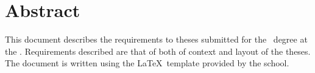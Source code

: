 \chapter*{Abstract}\label{abstract}
This document describes the requirements to theses submitted for the
\ThesisDegreeName\ degree at the \ThesisSchoolName.  Requirements
described are that of both of context and layout of the theses.  The
document is written using the \LaTeX\ template provided by the school.
